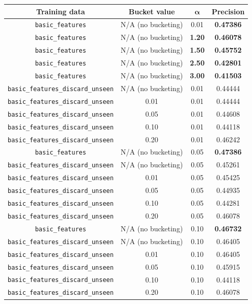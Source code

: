 \documentclass{article}
\begin{document}
{\small\begin{tabular}{|c|c|c|c|}\hline
Training data & Bucket value & $\bm{\alpha}$ & Precision\\\hline
\texttt{basic\_features} & N/A (no bucketing) & 0.01 & \textbf{0.47386}\\
\texttt{basic\_features} & N/A (no bucketing) & \textbf{1.20} & \textbf{0.46078}\\
\texttt{basic\_features} & N/A (no bucketing) & \textbf{1.50} & \textbf{0.45752}\\
\texttt{basic\_features} & N/A (no bucketing) & \textbf{2.50} & \textbf{0.42801}\\\hline\hline
\texttt{basic\_features} & N/A (no bucketing) & \textbf{3.00} & \textbf{0.41503}\\\hline\hline

\texttt{basic\_features\_discard\_unseen} & N/A (no bucketing) & 0.01 & 0.44444\\
\texttt{basic\_features\_discard\_unseen} & 0.01 & 0.01 & 0.44444\\
\texttt{basic\_features\_discard\_unseen} & 0.05 & 0.01 & 0.44608\\
\texttt{basic\_features\_discard\_unseen} & 0.10 & 0.01 & 0.44118\\
\texttt{basic\_features\_discard\_unseen} & 0.20 & 0.01 & 0.46242\\\hline

\texttt{basic\_features} & N/A (no bucketing) & 0.05 & \textbf{0.47386}\\
\texttt{basic\_features\_discard\_unseen} & N/A (no bucketing) & 0.05 & 0.45261\\
\texttt{basic\_features\_discard\_unseen} & 0.01 & 0.05 & 0.45425\\
\texttt{basic\_features\_discard\_unseen} & 0.05 & 0.05 & 0.44935\\
\texttt{basic\_features\_discard\_unseen} & 0.10 & 0.05 & 0.44281\\
\texttt{basic\_features\_discard\_unseen} & 0.20 & 0.05 & 0.46078\\\hline

\texttt{basic\_features} & N/A (no bucketing) & 0.10 & \textbf{0.46732}\\
\texttt{basic\_features\_discard\_unseen} & N/A (no bucketing) & 0.10 & 0.46405\\
\texttt{basic\_features\_discard\_unseen} & 0.01 & 0.10 & 0.46405\\
\texttt{basic\_features\_discard\_unseen} & 0.05 & 0.10 & 0.45915\\
\texttt{basic\_features\_discard\_unseen} & 0.10 & 0.10 & 0.44118\\
\texttt{basic\_features\_discard\_unseen} & 0.20 & 0.10 & 0.46078\\\hline
\end{tabular}}\par\bigskip
\end{document}

